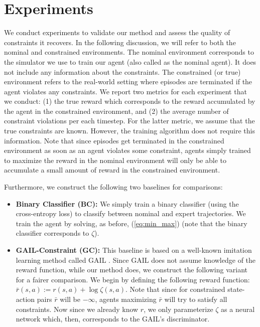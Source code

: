 \documentclass{article}
\begin{document}
\section{Experiments}
\label{sec:exp}
We conduct experiments to validate our method and assess the quality of constraints it recovers. In the following discussion, we will refer to both the nominal and constrained environments. The nominal environment corresponds to the simulator we use to train our agent (also called as the nominal agent). It does not include any information about the constraints. The constrained (or true) environment refers to the real-world setting where episodes are terminated if the agent violates any constraints. We report two metrics for each experiment that we conduct: (1) the true reward which corresponds to the reward accumulated by the agent in the constrained environment, and (2) the average number of constraint violations per each timestep. For the latter metric, we assume that the true constraints are known. However, the training algorithm does not require this information. Note that since episodes get terminated in the constrained environment as soon as an agent violates some constraint, agents simply trained to maximize the reward in the nominal environment will only be able to accumulate a small amount of reward in the constrained environment.

Furthermore, we construct the following two baselines for comparisons:
\begin{itemize}
    \item {\bfseries Binary Classifier (BC):} We simply train a binary classifier (using the cross-entropy loss) to classify between nominal and expert trajectories. We train the agent by solving, as before, (\ref{eq:min_max}) (note that the binary classifier corresponds to $\zeta$).
    \item {\bfseries GAIL-Constraint (GC):} This baseline is based on a well-known imitation learning method called GAIL \citep{ho2016gail}. Since GAIL does not assume knowledge of the reward function, while our method does, we construct the following variant for a fairer comparison. We begin by defining the following reward function: $\bar{r}(s,a) := r(s,a) + \log \zeta(s,a)$. Note that since for constrained state-action pairs $\bar{r}$ will be $-\infty$, agents maximizing $\bar{r}$ will try to satisfy all constraints. Now since we already know $r$, we only parameterize $\zeta$ as a neural network which, then, corresponds to the GAIL's discriminator.
\end{itemize}
\end{document}
